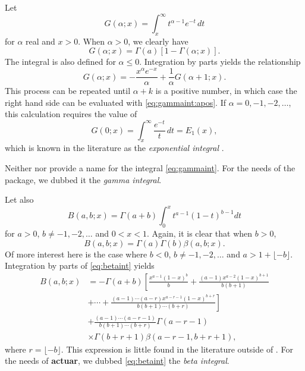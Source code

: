 \documentclass[x11names]{article}
\newcommand{\pkg}[1]{\textbf{#1}}
\begin{document}
Let
\begin{equation}
  \label{eq:gammaint}
  G(\alpha; x) = \int_x^\infty t^{\alpha - 1} e^{-t}\, dt
\end{equation}
for $\alpha$ real and $x > 0$. When $\alpha > 0$, we clearly have
\begin{equation}
  \label{eq:gammaint:apos}
  G(\alpha; x) = \Gamma(a) [1 - \Gamma(\alpha; x)].
\end{equation}
The integral is also defined for $\alpha \le 0$. Integration by parts
yields the relationship
\begin{equation*}
  G(\alpha; x) = -\frac{x^\alpha e^{-x}}{\alpha}
  + \frac{1}{\alpha} G(\alpha + 1; x).
\end{equation*}
This process can be repeated until $\alpha + k$ is a positive number,
in which case the right hand side can be evaluated with
\eqref{eq:gammaint:apos}. If $\alpha = 0, -1, -2, \dots$, this
calculation requires the value of
\begin{equation*}
  \label{eq:expint}
  G(0; x) = \int_x^\infty \frac{e^{-t}}{t}\, dt = E_1(x),
\end{equation*}
which is known in the literature as the \emph{exponential integral}
\citep{Abramowitz:1972}.

Neither \citet{LossModels4e} nor \citet{Abramowitz:1972} provide a
name for the integral \eqref{eq:gammaint}. For the needs of the
package, we dubbed it the \emph{gamma integral}.

Let also
\begin{equation}
  \label{eq:betaint}
  B(a, b; x) = \Gamma(a + b) \int_0^x t^{a-1} (1-t)^{b-1} dt
\end{equation}
for $a > 0$, $b \neq -1, -2, \dots$ and $0 < x < 1$. Again, it is
clear that when $b > 0$,
\begin{equation*}
  B(a, b; x) = \Gamma(a) \Gamma(b) \beta(a, b; x).
\end{equation*}
Of more interest here is the case where $b < 0$,
$b \neq -1, -2, \dots$ and $a > 1 + \lfloor -b\rfloor$. Integration by
parts of \eqref{eq:betaint} yields
\begin{equation*}
  \begin{split}
    B(a, b; x)
    &= \displaystyle
    -\Gamma(a + b) \left[ \frac{x^{a-1} (1-x)^b}{b}
      + \frac{(a-1) x^{a-2} (1-x)^{b+1}}{b (b+1)} \right. \\
    &  \displaystyle\left.
      + \cdots + \frac{(a-1) \cdots (a-r) x^{a-r-1}
        (1-x)^{b+r}}{b (b+1) \cdots (b+r)} \right] \\
    &   \displaystyle
    + \frac{(a-1) \cdots (a-r-1)}{b (b+1) \cdots (b+r)}
    \Gamma(a-r-1) \\
    &  \times \Gamma(b+r+1) \beta(a-r-1, b+r+1),
  \end{split}
\end{equation*}
where $r = \lfloor -b\rfloor$. This expression is little found in the
literature outside of \citet{LossModels4e}. For the needs of
\pkg{actuar}, we dubbed \eqref{eq:betaint} the \emph{beta
  integral}.
\end{document}
